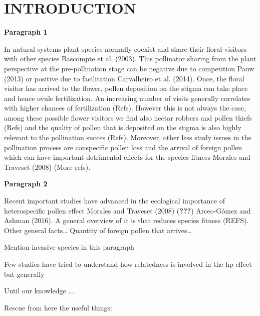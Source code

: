 \documentclass[11pt,a4paper]{article}
\begin{document}
\section{INTRODUCTION}\label{introduction}

\textbf{Paragraph 1}

In natural systems plant species normally coexist and share their floral
visitors with other species Bascompte et al. (2003). This pollinator
sharing from the plant perspective at the pre-pollination stage can be
negative due to competition Pauw (2013) or positive due to facilitation
Carvalheiro et al. (2014). Once, the floral visitor has arrived to the
flower, pollen deposition on the stigma can take place and hence ovule
fertilization. An increasing number of visits generally correlates with
higher chances of fertilization (Refs). However this is not always the
case, among these possible flower visitors we find also nectar robbers
and pollen thiefs (Refs) and the quality of pollen that is deposited on
the stigma is also highly relevant to the pollination succes (Refs).
Moreover, other less study issues in the pollination process are
conspecific pollen loss and the arrival of foreign pollen which can have
important detrimental effects for the species fitness Morales and
Traveset (2008) (More refs).

\textbf{Paragraph 2}

Recent important studies have advanced in the ecological importance of
heterospecific pollen effect Morales and Traveset (2008)
({\textbf{???}}) Arceo-Gómez and Ashman (2016). A general overview of it
is that reduces species fitness (REFS). Other general facts\ldots{}
Quantity of foreign pollen that arrives\ldots{}

Mention invasive species in this paragraph

Few studies have tried to understand how relatedness is involved in the
hp effect but generally

Until our knowledge \ldots{}.

Rescue from here the useful things:
\end{document}
